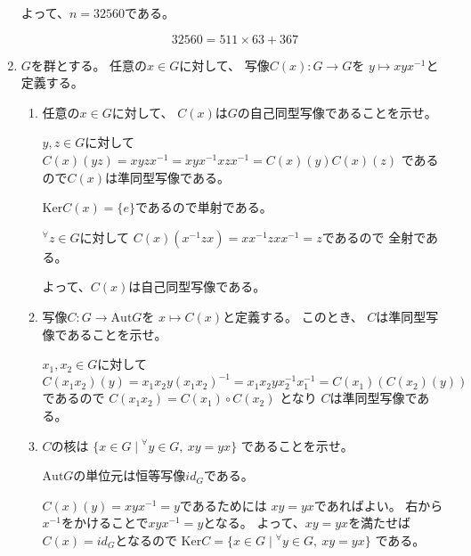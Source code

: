 \documentclass[12pt,b5paper]{ltjsarticle}
\begin{document}
\begin{enumerate}
      よって、$n=32560$である。


      \begin{equation}
       32560 = 511 \times 63 + 367
      \end{equation}


      \hrulefill

 \item
      $G$を群とする。
      任意の$x\in G$に対して、
      写像$C(x):G\rightarrow G$を
      $y\mapsto xyx^{-1}$と定義する。
      \begin{enumerate}
       \item
            任意の$x\in G$に対して、
            $C(x)$は$G$の自己同型写像であることを示せ。

            \dotfill

            $y,z\in G$に対して
            $C(x)(yz)=xyzx^{-1}=xyx^{-1}xzx^{-1}=C(x)(y)C(x)(z)$
            であるので$C(x)$は準同型写像である。

            $\mathrm{Ker}C(x)=\{e\}$であるので単射である。

            ${}^{\forall}z\in G$に対して
            $C(x)(x^{-1}zx)=xx^{-1}zxx^{-1}=z$であるので
            全射である。

            よって、$C(x)$は自己同型写像である。

            \hrulefill

       \item
            写像$C:G \to \mathrm{Aut} G$を
            $x\mapsto C(x)$と定義する。
            このとき、
            $C$は準同型写像であることを示せ。

            \dotfill

            $x_1,x_2\in G$に対して
            \begin{equation}
             C(x_1x_2)(y)=x_1x_2y(x_1x_2)^{-1}
              = x_1x_2yx_2^{-1}x_1^{-1}
              = C(x_1) \left( C(x_2)(y) \right)
            \end{equation}
            であるので
            $C(x_1x_2)=C(x_1)\circ C(x_2)$
            となり
            $C$は準同型写像である。

            \hrulefill

       \item
            $C$の核は
            $\{x\in G \mid {}^{\forall}y\in G,\ xy=yx\}$
            であることを示せ。

            \dotfill

            $\mathrm{Aut}G$の単位元は恒等写像$id_{G}$である。

            $C(x)(y)=xyx^{-1}=y$であるためには
            $xy=yx$であればよい。
            右から$x^{-1}$をかけることで$xyx^{-1}=y$となる。
            よって、$xy=yx$を満たせば$C(x)=id_{G}$となるので
            $\mathrm{Ker}C = \{x\in G \mid {}^{\forall}y\in G,\ xy=yx\}$
            である。


            \hrulefill

      \end{enumerate}

\end{enumerate}
\end{document}

